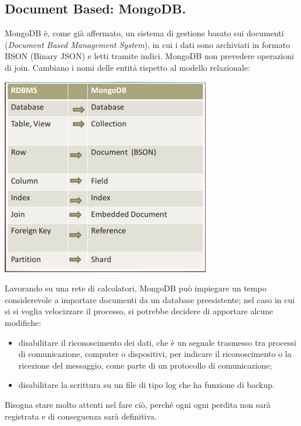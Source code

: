 \documentclass[a4page, 11pt]{article}
\begin{document}
\subsection{Document Based: MongoDB\cite{MongoDB, ScalingMongoDB}.}
MongoDB è, come già affermato, un sistema di gestione basato sui documenti (\textit{Document Based Management System}), in cui i dati sono archiviati in formato BSON (Binary JSON) e letti tramite indici.
MongoDB non prevedere operazioni di join.
Cambiano i nomi delle entità rispetto al modello relazionale:
\begin{center}
  \includegraphics[scale=0.6]{IMAGE2.jpg}
\end{center}

Lavorando su una rete di calcolatori, MongoDB può impiegare un tempo considerevole a importare documenti da un database preesistente; nel caso in cui si si voglia velocizzare il processo, si potrebbe decidere di apportare alcune modifiche:
\begin{itemize}[noitemsep]
\item disabilitare il riconoscimento dei dati, che è un segnale trasmesso tra processi di comunicazione, computer o dispositivi, per indicare il riconoscimento o la ricezione del messaggio, come parte di un protocollo di comunicazione;
\item disabilitare la scrittura su un file di tipo log che ha funzione di backup.
\end{itemize}
Bisogna stare molto attenti nel fare ciò, perché ogni ogni perdita non sarà registrata e di conseguenza sarà definitiva.
\newline
\end{document}
